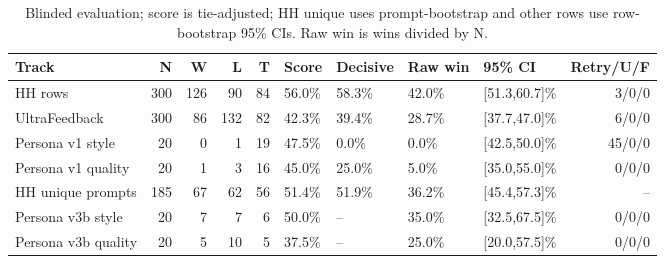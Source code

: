 \begin{table}[H]\centering\small\caption{Blinded evaluation; score is tie-adjusted; HH unique uses prompt-bootstrap and other rows use row-bootstrap 95\% CIs. Raw win is wins divided by N.}\label{tab:blinded}
\begin{tabular}{lrrrrllllr}\toprule Track & N & W & L & T & Score & Decisive & Raw win & 95\% CI & Retry/U/F\\\midrule
HH rows & 300 & 126 & 90 & 84 & 56.0\% & 58.3\% & 42.0\% & [51.3,60.7]\% & 3/0/0\\
UltraFeedback & 300 & 86 & 132 & 82 & 42.3\% & 39.4\% & 28.7\% & [37.7,47.0]\% & 6/0/0\\
Persona v1 style & 20 & 0 & 1 & 19 & 47.5\% & 0.0\% & 0.0\% & [42.5,50.0]\% & 45/0/0\\
Persona v1 quality & 20 & 1 & 3 & 16 & 45.0\% & 25.0\% & 5.0\% & [35.0,55.0]\% & 0/0/0\\
HH unique prompts & 185 & 67 & 62 & 56 & 51.4\% & 51.9\% & 36.2\% & [45.4,57.3]\% & --\\
Persona v3b style & 20 & 7 & 7 & 6 & 50.0\% & -- & 35.0\% & [32.5,67.5]\% & 0/0/0\\
Persona v3b quality & 20 & 5 & 10 & 5 & 37.5\% & -- & 25.0\% & [20.0,57.5]\% & 0/0/0\\
\bottomrule\end{tabular}\end{table}

